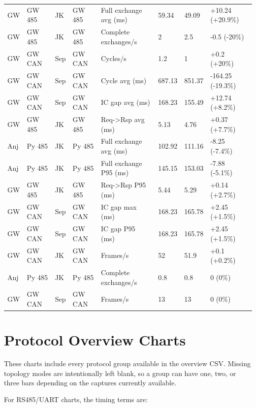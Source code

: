 \documentclass[11pt,a4paper]{article}
\newcommand{\increase}[1]{\textcolor{increasecolor}{#1}}
\newcommand{\decrease}[1]{\textcolor{decreasecolor}{#1}}
\begin{document}
\begin{landscape}
\begin{longtable}{@{}L{1.6cm}L{2.2cm}L{1.5cm}L{2.2cm}L{5.0cm}L{1.4cm}L{1.4cm}L{3.7cm}@{}}
GW & GW 485 & JK & GW 485 & Full exchange avg (ms) & 59.34 & 49.09 & \increase{+10.24 (+20.9\%)} \\
GW & GW 485 & JK & GW 485 & Complete exchanges/s & 2 & 2.5 & \decrease{-0.5 (-20\%)} \\
GW & GW CAN & Sep & GW CAN & Cycles/s & 1.2 & 1 & \increase{+0.2 (+20\%)} \\
GW & GW CAN & Sep & GW CAN & Cycle avg (ms) & 687.13 & 851.37 & \decrease{-164.25 (-19.3\%)} \\
GW & GW CAN & Sep & GW CAN & IC gap avg (ms) & 168.23 & 155.49 & \increase{+12.74 (+8.2\%)} \\
GW & GW 485 & JK & GW 485 & Req->Rsp avg (ms) & 5.13 & 4.76 & \increase{+0.37 (+7.7\%)} \\
Anj & Py 485 & JK & Py 485 & Full exchange avg (ms) & 102.92 & 111.16 & \decrease{-8.25 (-7.4\%)} \\
Anj & Py 485 & JK & Py 485 & Full exchange P95 (ms) & 145.15 & 153.03 & \decrease{-7.88 (-5.1\%)} \\
GW & GW 485 & JK & GW 485 & Req->Rsp P95 (ms) & 5.44 & 5.29 & \increase{+0.14 (+2.7\%)} \\
GW & GW CAN & Sep & GW CAN & IC gap max (ms) & 168.23 & 165.78 & \increase{+2.45 (+1.5\%)} \\
GW & GW CAN & Sep & GW CAN & IC gap P95 (ms) & 168.23 & 165.78 & \increase{+2.45 (+1.5\%)} \\
GW & GW CAN & JK & GW CAN & Frames/s & 52 & 51.9 & \increase{+0.1 (+0.2\%)} \\
Anj & Py 485 & JK & Py 485 & Complete exchanges/s & 0.8 & 0.8 & 0 (0\%) \\
GW & GW CAN & Sep & GW CAN & Frames/s & 13 & 13 & 0 (0\%) \\
\bottomrule
\end{longtable}
\endgroup
\end{landscape}


\section{Protocol Overview Charts}

These charts include every protocol group available in the overview CSV. Missing
topology modes are intentionally left blank, so a group can have one, two, or three
bars depending on the captures currently available.

For RS485/UART charts, the timing terms are:
\end{document}
